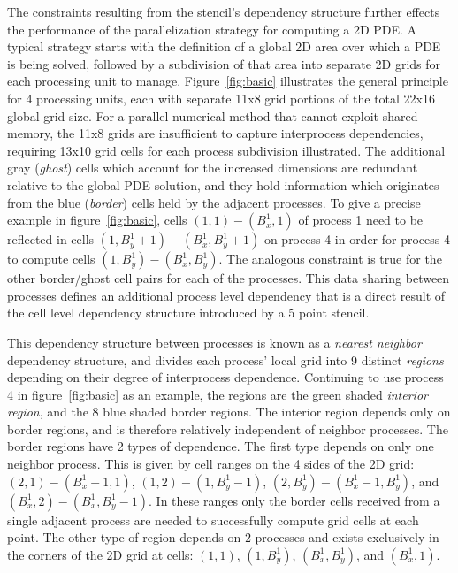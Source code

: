 The constraints resulting from the stencil's dependency structure
further effects the performance of the
parallelization strategy for computing a 2D PDE.  A typical
strategy starts with the definition of a global 2D area over which
a PDE is being solved, followed by a subdivision of that area
into separate 2D grids for each
processing unit to manage.  Figure~\ref{fig:basic} illustrates the general principle for
4 processing units, each with separate
11x8 grid portions of the total 22x16 global grid size.
For a parallel numerical method that cannot exploit shared memory,
the 11x8 grids are insufficient to capture interprocess
dependencies, requiring
13x10 grid cells for each process subdivision illustrated.
The additional gray ({\it ghost}) cells which account for the increased
dimensions are redundant relative to the global PDE solution, and they
hold information which originates from the blue ({\it border}) cells
held by the adjacent processes.  To give a precise example in
figure~\ref{fig:basic},
cells $(1,1) - (B_x^1,1)$ of process 1 need to be
reflected in cells $(1,B_y^1+1) - (B_x^1, B_y^1+1)$ on process 4 in order
for process 4 to compute cells $(1,B_y^1) - (B_x^1, B_y^1)$.  The analogous
constraint is true for the other border/ghost cell pairs for each of the
processes.
This data sharing between processes defines an additional process level
 dependency that is a direct
  result of the cell level dependency structure introduced by a 5 point
  stencil.

This dependency structure between processes is known as a
{\it nearest neighbor} dependency structure, and divides
each process' local grid into 9 distinct {\it regions} depending on
their degree of interprocess dependence.  Continuing to use process 4
in figure~\ref{fig:basic} as an example, the
regions are the green
shaded {\it interior region}, and the 8 blue shaded border regions.  The interior region depends only on border
regions, and is therefore relatively independent of neighbor processes.
The border regions have 2 types of dependence.  The first type depends on only one neighbor process.  This is
given by cell ranges on the 4 sides of the 2D grid: $(2,1) - (B_x^1 - 1, 1)$, $(1,2) - (1,B_y^1 - 1)$,
$(2,B_y^1) - (B_x^1 - 1, B_y^1)$, and $(B_x^1,2) - (B_x^1,B_y^1 - 1)$.  In these ranges only the
border cells received from a single adjacent process are
needed to successfully compute grid cells at each point.  The other type of
region depends on 2 processes and exists exclusively
in the corners of the 2D grid at cells: $(1,1)$, $(1,B_y^1)$, $(B_x^1,B_y^1)$,
and $(B_x^1,1)$.

